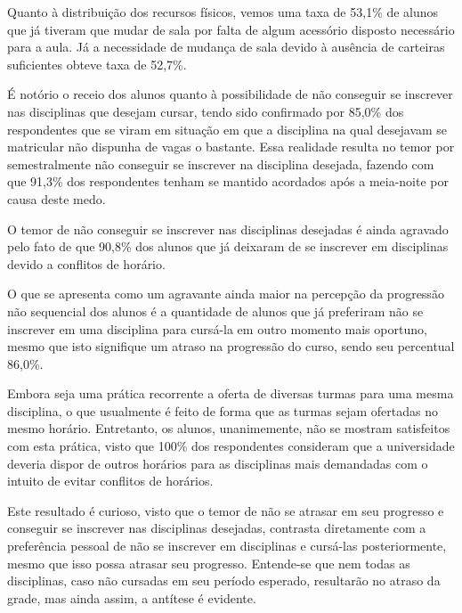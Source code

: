 \begin{apendicesenv}

  Quanto à distribuição dos recursos físicos, vemos uma taxa de 53,1\% de alunos que já tiveram que mudar de sala por falta de algum acessório disposto necessário para a aula. Já a necessidade de mudança de sala devido à ausência de carteiras suficientes obteve taxa de 52,7\%.

  É notório o receio dos alunos quanto à possibilidade de não conseguir se inscrever nas disciplinas que desejam cursar, tendo sido confirmado por 85,0\% dos respondentes que se viram em situação em que a disciplina na qual desejavam se matricular não dispunha de vagas o bastante. Essa realidade resulta no temor por semestralmente não conseguir se inscrever na disciplina desejada, fazendo com que 91,3\% dos respondentes tenham se mantido acordados após a meia-noite por causa deste medo.

  O temor de não conseguir se inscrever nas disciplinas desejadas é ainda agravado pelo fato de que 90,8\% dos alunos que já deixaram de se inscrever em disciplinas devido a conflitos de horário.

  O que se apresenta como um agravante ainda maior na percepção da progressão não sequencial dos alunos é a quantidade de alunos que já preferiram não se inscrever em uma disciplina para cursá-la em outro momento mais oportuno, mesmo que isto signifique um atraso na progressão do curso, sendo seu percentual 86,0\%.

  Embora seja uma prática recorrente a oferta de diversas turmas para uma mesma disciplina, o que usualmente é feito de forma que as turmas sejam ofertadas no mesmo horário. Entretanto, os alunos, unanimemente, não se mostram satisfeitos com esta prática, visto que 100\% dos respondentes consideram que a universidade deveria dispor de outros horários para as disciplinas mais demandadas com o intuito de evitar conflitos de horários.

  Este resultado é curioso, visto que o temor de não se atrasar em seu progresso e conseguir se inscrever nas disciplinas desejadas, contrasta diretamente com a preferência pessoal de não se inscrever em disciplinas e cursá-las posteriormente, mesmo que isso possa atrasar seu progresso. Entende-se que nem todas as disciplinas, caso não cursadas em seu período esperado, resultarão no atraso da grade, mas ainda assim, a antítese é evidente.


\end{apendicesenv}

